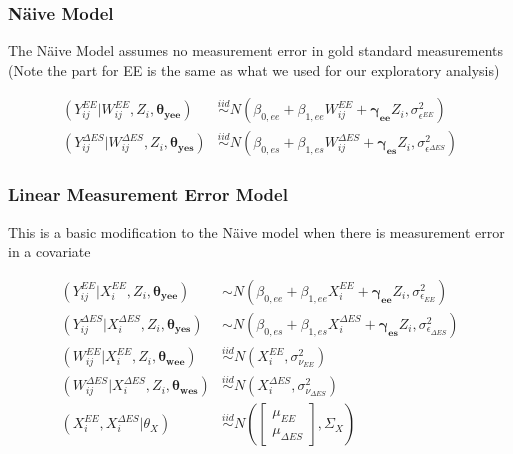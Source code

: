 \documentclass[handout]{beamer}\usepackage[]{graphicx}\usepackage[]{color}
\begin{document}
\begin{frame}
\frametitle{N{\"a}ive Model}

The N{\"a}ive Model assumes no measurement error in gold standard measurements (Note the part for EE is the same as what we used for our exploratory analysis) \\

\vspace{1cm}

\begin{align*}
  (Y_{ij}^{EE} | W_{ij}^{EE},Z_i,\boldsymbol{\theta_{yee}}) &\overset{iid}{\sim} N(\beta_{0,ee} + \beta_{1,ee}W_{ij}^{EE}+ \boldsymbol{\gamma_{ee}}Z_i,\sigma_{\epsilon^{EE}}^2) \\
  (Y_{ij}^{\Delta ES} | W_{ij}^{\Delta ES},Z_i,\boldsymbol{\theta_{yes}}) &\overset{iid}{\sim} N(\beta_{0,es} + \beta_{1,es}W_{ij}^{\Delta ES}+ \boldsymbol{\gamma_{es}}Z_i,\sigma_{\epsilon^{\Delta ES}}^2)
\end{align*}

\end{frame}


\begin{frame}
\frametitle{Linear Measurement Error Model}
This is a basic modification to the N{\"a}ive model when there is measurement error in a covariate

\begin{align*}
  (Y_{ij}^{EE}|X_i^{EE}, Z_i,\boldsymbol{\theta_{yee}}) &\sim N(\beta_{0,ee} + \beta_{1,ee}X_i^{EE} + \boldsymbol{\gamma_{ee}}Z_i, \sigma_{\epsilon_{EE}}^2) \\
  (Y_{ij}^{\Delta ES}|X_i^{\Delta ES}, Z_i,\boldsymbol{\theta_{yes}}) &\sim N(\beta_{0,es} + \beta_{1,es}X_i^{\Delta ES} +  \boldsymbol{\gamma_{es}}Z_i, \sigma_{\epsilon_{\Delta ES}}^2) \\
  (W_{ij}^{EE}|X_i^{EE}, Z_i,\boldsymbol{\theta_{wee}}) &\overset{iid}{\sim} N(X_i^{EE}, \sigma_{\nu_{EE}}^2 ) \\
  (W_{ij}^{\Delta ES}|X_i^{\Delta ES}, Z_i,\boldsymbol{\theta_{wes}}) &\overset{iid}{\sim} N(X_i^{\Delta ES}, \sigma_{\nu_{\Delta ES}}^2 )  \\
  (X_i^{EE},X_i^{\Delta ES}|\theta_X) &\overset{iid}{\sim} N\left(
  \begin{bmatrix}
  \mu_{EE}\\
  \mu_{\Delta ES}
  \end{bmatrix}
  , \Sigma_X
  \right)
\end{align*}

\end{frame}
\end{document}
